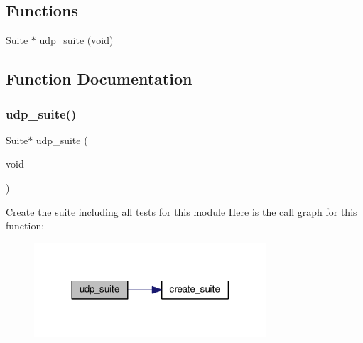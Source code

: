 \subsection*{Functions}
\begin{DoxyCompactItemize}
\item 
Suite $\ast$ \hyperlink{openmote-cc2538_2lwip_2test_2unit_2udp_2test__udp_8h_a27c639513ddd63008e18da3a92332cb3}{udp\+\_\+suite} (void)
\end{DoxyCompactItemize}


\subsection{Function Documentation}
\mbox{\label{openmote-cc2538_2lwip_2test_2unit_2udp_2test__udp_8h_a27c639513ddd63008e18da3a92332cb3}} 
\subsubsection{\texorpdfstring{udp\+\_\+suite()}{udp\_suite()}}
{\footnotesize\ttfamily Suite$\ast$ udp\+\_\+suite (\begin{DoxyParamCaption}\item[{void}]{ }\end{DoxyParamCaption})}

Create the suite including all tests for this module Here is the call graph for this function\+:
\nopagebreak
\begin{figure}[H]
\begin{center}
\leavevmode
\includegraphics[width=245pt]{openmote-cc2538_2lwip_2test_2unit_2udp_2test__udp_8h_a27c639513ddd63008e18da3a92332cb3_cgraph}
\end{center}
\end{figure}
